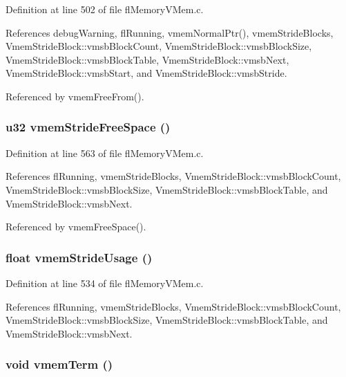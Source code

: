 Definition at line 502 of file fl\-Memory\-VMem.c.

References debug\-Warning, fl\-Running, vmem\-Normal\-Ptr(), vmem\-Stride\-Blocks, Vmem\-Stride\-Block::vmsb\-Block\-Count, Vmem\-Stride\-Block::vmsb\-Block\-Size, Vmem\-Stride\-Block::vmsb\-Block\-Table, Vmem\-Stride\-Block::vmsb\-Next, Vmem\-Stride\-Block::vmsb\-Start, and Vmem\-Stride\-Block::vmsb\-Stride.

Referenced by vmem\-Free\-From().
\subsubsection{\setlength{\rightskip}{0pt plus 5cm}u32 vmem\-Stride\-Free\-Space ()}\label{flMemoryVMem_8c_9d368ada737fd80bb8abed2825c326ff}




Definition at line 563 of file fl\-Memory\-VMem.c.

References fl\-Running, vmem\-Stride\-Blocks, Vmem\-Stride\-Block::vmsb\-Block\-Count, Vmem\-Stride\-Block::vmsb\-Block\-Size, Vmem\-Stride\-Block::vmsb\-Block\-Table, and Vmem\-Stride\-Block::vmsb\-Next.

Referenced by vmem\-Free\-Space().
\subsubsection{\setlength{\rightskip}{0pt plus 5cm}float vmem\-Stride\-Usage ()}\label{flMemoryVMem_8c_c1ffa02ebd6cebc73b39aba7dff8a43a}




Definition at line 534 of file fl\-Memory\-VMem.c.

References fl\-Running, vmem\-Stride\-Blocks, Vmem\-Stride\-Block::vmsb\-Block\-Count, Vmem\-Stride\-Block::vmsb\-Block\-Size, Vmem\-Stride\-Block::vmsb\-Block\-Table, and Vmem\-Stride\-Block::vmsb\-Next.
\subsubsection{\setlength{\rightskip}{0pt plus 5cm}void vmem\-Term ()}\label{flMemoryVMem_8c_ae3e2102bd1766ba9ac8ddf6bbc1ccdb}




